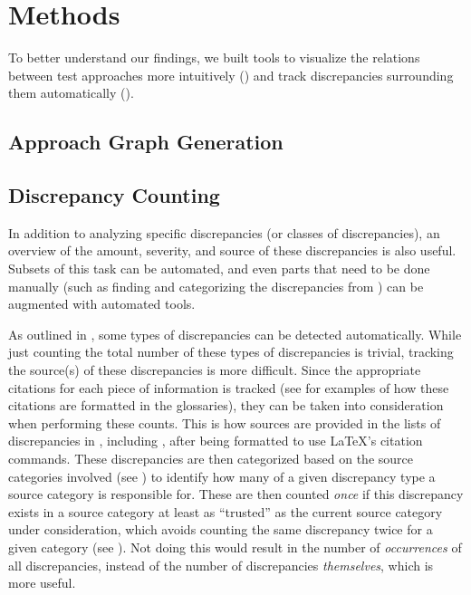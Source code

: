 \section{Methods}
\label{methods}

To better understand our findings, we built tools to visualize the
relations between test approaches more intuitively () and track
discrepancies surrounding them automatically ().

\subsection{Approach Graph Generation}
\label{graph-gen}

\graphGenDesc{}

\subsection{Discrepancy Counting}
\label{discrep-count}

In addition to analyzing specific discrepancies (or classes of discrepancies),
an overview of the amount, severity, and source of these discrepancies is also
useful. Subsets of this task can be automated, and even parts that need to be
done manually (such as finding and categorizing the discrepancies from
) can be augmented with automated tools.

As outlined in , some types of discrepancies can be detected
automatically. While just counting the total number of these types of
discrepancies is trivial, tracking the source(s) of these discrepancies is more
difficult. Since the appropriate citations for each piece of information is
tracked (see  for examples of
how these citations are formatted
in the glossaries), they can be taken into consideration when performing
these counts. This is how sources are provided in the lists of discrepancies in
, including , after being formatted
to use \LaTeX{}'s citation commands. These discrepancies are then categorized
based on the source categories involved (see ) to identify how
many of a given discrepancy type a source category is responsible for. These
are then counted \emph{once} if this discrepancy exists in a source category at
least as ``trusted'' as the current source category under consideration, which
avoids counting the same discrepancy twice for a given category (see
). Not doing this would result in the number of
\emph{occurrences} of all discrepancies, instead of the number of discrepancies
\emph{themselves}, which is more useful.

